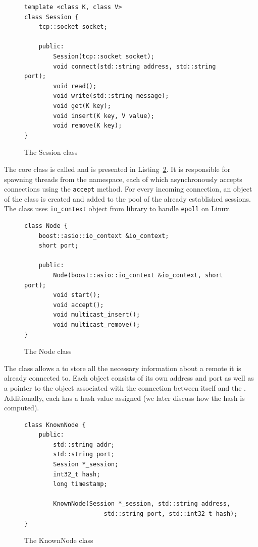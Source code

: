 \begin{figure}[ht] 
\renewcommand{\figurename}{Listing}
    \begin{lstlisting}
template <class K, class V>
class Session {
    tcp::socket socket;
    
    public:
        Session(tcp::socket socket);
        void connect(std::string address, std::string port);
        void read();
        void write(std::string message);
        void get(K key);
        void insert(K key, V value);
        void remove(K key);
}
\end{lstlisting}
\caption{The Session class}
\label{SessionListing}
\end{figure}

The core class is called \Node and is presented in Listing~\ref{NodeListing}. It is responsible for spawning threads from the \std namespace, each of which asynchronously accepts connections using the \texttt{accept} method. For every incoming connection, an object of the \Session class is created and added to the pool of the already established sessions. The class uses \texttt{io\_context} object from \Asio library to handle \texttt{epoll} on Linux.

\begin{figure}[ht] 
\renewcommand{\figurename}{Listing}
\begin{lstlisting}
class Node {
    boost::asio::io_context &io_context;
    short port;
    
    public:
        Node(boost::asio::io_context &io_context, short port);
        void start();
        void accept();
        void multicast_insert();
        void multicast_remove();
}
    \end{lstlisting}
\caption{The Node class}
\label{NodeListing}
\end{figure}
        
The \KnownNode class allows a \Node to store all the necessary information about a remote \Node it is already connected to.
Each \KnownNode object consists of its own address and port as well as a pointer to the \Session object associated with the connection between itself and the \Node. 
Additionally, each \KnownNode has a hash value assigned (we later discuss how the hash is computed).

\begin{figure}[ht] 
\renewcommand{\figurename}{Listing}
    \begin{lstlisting}
class KnownNode {
    public:
        std::string addr;
        std::string port;
        Session *_session;
        int32_t hash;
        long timestamp;

        KnownNode(Session *_session, std::string address,
                      std::string port, std::int32_t hash);
}
    \end{lstlisting}
    
\caption{The KnownNode class}
\label{Node}
\end{figure}

